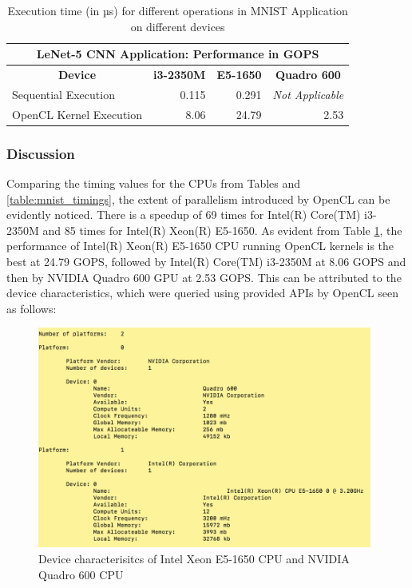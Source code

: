 \begin{table}[h!]
\centering
 \caption{Execution time (in µs) for different operations in MNIST Application on different devices}
 \vspace{3mm}
 \renewcommand\arraystretch{1.6}
 \begin{tabular}{ | m{12em} | r | r | r |  }
 \hline
 \multicolumn{4}{|c|}{LeNet-5 CNN Application: Performance in GOPS} \\
 \hline
 \multicolumn{1}{|c|}{\bfseries Device} & \multicolumn{1}{c|}{\bfseries i3-2350M} & \multicolumn{1}{c|}{\bfseries E5-1650} & \multicolumn{1}{c|}{\bfseries Quadro 600} \\
 \hline
 Sequential Execution & 0.115 &  0.291 & \textit{Not Applicable} \\\hline
 OpenCL Kernel Execution & 8.06 &  24.79 & 2.53 \\
 
 \hline
 \end{tabular}
 \label{table:mnist_gops}
\end{table}

\subsubsection*{Discussion}
\label{sect5_3_3_b}

Comparing the timing values for the CPUs from Tables and \ref{table:mnist_timings}, the extent of parallelism introduced by OpenCL can be evidently noticed. There is a speedup of 69 times for Intel(R) Core(TM) i3-2350M and 85 times for Intel(R) Xeon(R) E5-1650. \newline\newline
As evident from Table \ref{table:mnist_gops}, the performance of Intel(R) Xeon(R) E5-1650 CPU running OpenCL kernels is the best at 24.79 GOPS, followed by Intel(R) Core(TM) i3-2350M at 8.06 GOPS and then by NVIDIA Quadro 600 GPU at 2.53 GOPS. This can be attributed to the device characteristics, which were queried using provided APIs by OpenCL seen as follows:

\begin{figure}[h!]
\centering
\includegraphics[width=11cm]{figures/Devquery.png}
\caption{Device characterisitcs of Intel Xeon E5-1650 CPU and NVIDIA Quadro 600 CPU}
\label{fig:cnn17}
\end{figure}

